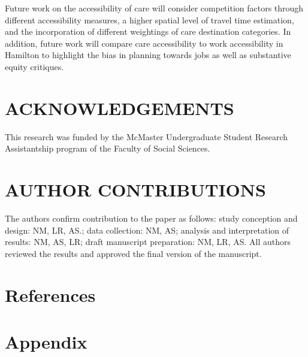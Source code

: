 \documentclass[
  super,
  preprint,
  3p]{elsarticle}
\begin{document}
Future work on the accessibility of care will consider competition
factors through different accessibility measures, a higher spatial level
of travel time estimation, and the incorporation of different weightings
of care destination categories. In addition, future work will compare
care accessibility to work accessibility in Hamilton to highlight the
bias in planning towards jobs as well as substantive equity critiques.

\hypertarget{acknowledgements}{%
\section{ACKNOWLEDGEMENTS}\label{acknowledgements}}

This research was funded by the McMaster Undergraduate Student Research
Assistantship program of the Faculty of Social Sciences.

\hypertarget{author-contributions}{%
\section{AUTHOR CONTRIBUTIONS}\label{author-contributions}}

The authors confirm contribution to the paper as follows: study
conception and design: NM, LR, AS.; data collection: NM, AS; analysis
and interpretation of results: NM, AS, LR; draft manuscript preparation:
NM, LR, AS. All authors reviewed the results and approved the final
version of the manuscript.

\hypertarget{references}{%
\section*{References}\label{references}}

\hypertarget{appendix}{%
\section{Appendix}\label{appendix}}


  
\end{document}
